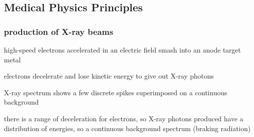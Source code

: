 {\begin{enumerate}
	
	
\end{enumerate}

\newpage 
\subsection*{Medical Physics Principles}

\subsubsection*{production of X-ray beams}

high-speed electrons accelerated in an electric field smash into an anode target metal

electrons decelerate and lose kinetic energy to give out X-ray photons

X-ray spectrum shows a few discrete spikes superimposed on a continuous background

there is a range of deceleration for electrons, so X-ray photons produced have a distribution of energies, so a continuous background spectrum (braking radiation)

}
